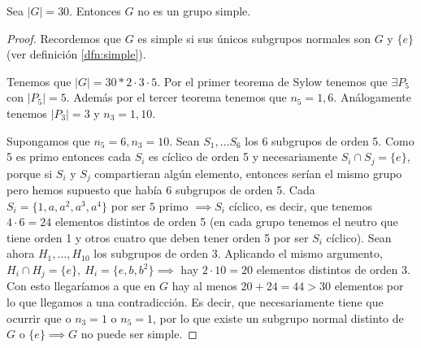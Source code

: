 \begin{ej}
	Sea $|G| = 30$. Entonces $G$ no es un grupo simple.
	\begin{proof}
		Recordemos que $G$ es simple si sus únicos subgrupos normales son $G$ y $\{e\}$ (ver definición \ref{dfn:simple}).
		
		Tenemos que $|G| = 30 * 2 \cdot 3 \cdot 5$. Por el primer teorema de Sylow tenemos que $\exists P_5$ con $|P_5| = 5$. Además por el tercer teorema tenemos que $n_5 = 1, 6$. Análogamente tenemos $|P_3| = 3$ y $n_3 = 1, 10$.
		
		Supongamos que $n_5 = 6, n_3 = 10$. Sean $S_1, \dots S_6$ los 6 subgrupos de orden 5. Como 5 es primo entonces cada $S_i$ es cíclico de orden 5 y necesariamente $S_i \cap S_j = \{e\}$, porque si $S_i$ y $S_j$ compartieran algún elemento, entonces serían el mismo grupo pero hemos supuesto que había 6 subgrupos de orden 5. Cada $S_i = \{1, a, a^2, a^3, a^4\}$ por ser $5$ primo $\implies S_i$ cíclico, es decir, que tenemos $4 \cdot 6 = 24$ elementos distintos de orden 5 (en cada grupo tenemos el neutro que tiene orden 1 y otros cuatro que deben tener orden 5 por ser $S_i$ cíclico). Sean ahora $H_1, \dots, H_{10}$ los subgrupos de orden 3. Aplicando el mismo argumento, $H_i \cap H_j = \{e\},\ H_i = \{e, b, b^2\} \implies$ hay $2 \cdot 10 = 20$ elementos distintos de orden 3. Con esto llegaríamos a que en $G$ hay al menos $20 + 24 = 44 > 30$ elementos por lo que llegamos a una contradicción. Es decir, que necesariamente tiene que ocurrir que o $n_3 = 1$ o $n_5 = 1$, por lo que existe un subgrupo normal distinto de $G$ o $\{e\} \implies G$ no puede ser simple.
	\end{proof}
\end{ej}

